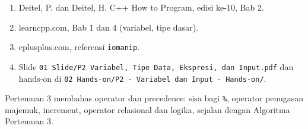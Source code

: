 \documentclass[a4paper]{article}
\begin{document}
\begin{enumerate}
\item Deitel, P. dan Deitel, H. C++ How to Program, edisi ke-10, Bab 2.
\item learncpp.com, Bab 1 dan 4 (variabel, tipe dasar).
\item cplusplus.com, referensi \texttt{iomanip}.
\item Slide \texttt{01 Slide/P2 Variabel, Tipe Data, Ekspresi, dan Input.pdf} dan hands-on di \texttt{02 Hands-on/P2 - Variabel dan Input - Hands-on/}.
\end{enumerate}
\begin{Penting}
Pertemuan 3 membahas operator dan precedence: sisa bagi \texttt{\%}, operator penugasan majemuk, increment, operator relasional dan logika, sejalan dengan Algoritma Pertemuan 3.
\end{Penting}
\end{document}
